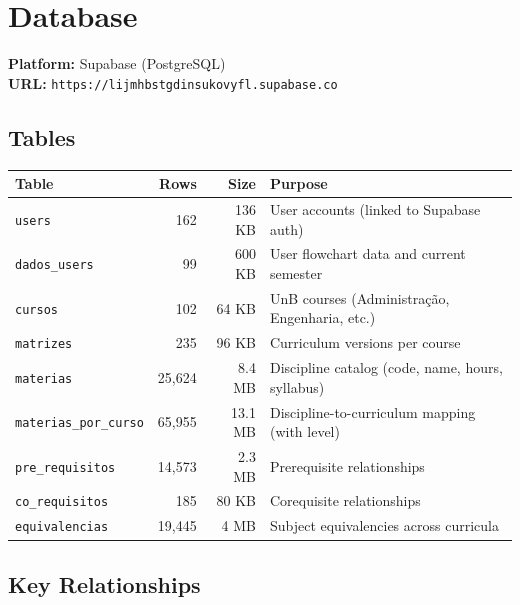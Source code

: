 \documentclass[11pt,a4paper]{article}
\newcommand{\code}[1]{\texttt{#1}}
\begin{document}
\section{Database}

\noindent\textbf{Platform:} Supabase (PostgreSQL)\\
\textbf{URL:} \code{https://lijmhbstgdinsukovyfl.supabase.co}

\subsection{Tables}

\begin{center}
\begin{longtable}{@{}L{3.5cm}rrL{5.5cm}@{}}
\toprule
\textbf{Table} & \textbf{Rows} & \textbf{Size} & \textbf{Purpose} \\
\midrule
\endhead
\code{users}              & 162    & 136 KB  & User accounts (linked to Supabase auth) \\
\code{dados\_users}        & 99     & 600 KB  & User flowchart data and current semester \\
\code{cursos}             & 102    & 64 KB   & UnB courses (Administração, Engenharia, etc.) \\
\code{matrizes}           & 235    & 96 KB   & Curriculum versions per course \\
\code{materias}           & 25,624 & 8.4 MB  & Discipline catalog (code, name, hours, syllabus) \\
\code{materias\_por\_curso} & 65,955 & 13.1 MB & Discipline-to-curriculum mapping (with level) \\
\code{pre\_requisitos}     & 14,573 & 2.3 MB  & Prerequisite relationships \\
\code{co\_requisitos}      & 185    & 80 KB   & Corequisite relationships \\
\code{equivalencias}      & 19,445 & 4 MB    & Subject equivalencies across curricula \\
\bottomrule
\end{longtable}
\end{center}

\subsection{Key Relationships}
\end{document}

